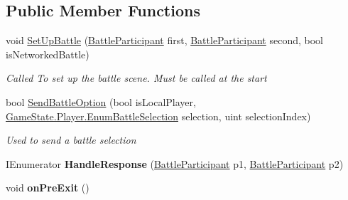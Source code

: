 \subsection*{Public Member Functions}
\begin{DoxyCompactItemize}
\item 
void \hyperlink{class_battle_handler_a380a371e96df1b362027a8f33c8ed7fb}{Set\-Up\-Battle} (\hyperlink{class_battle_participant}{Battle\-Participant} first, \hyperlink{class_battle_participant}{Battle\-Participant} second, bool is\-Networked\-Battle)
\begin{DoxyCompactList}\small\item\em Called To set up the battle scene. Must be called at the start \end{DoxyCompactList}\item 
bool \hyperlink{class_battle_handler_ad207e2adf6f1f3882e98b1c8a5f59f67}{Send\-Battle\-Option} (bool is\-Local\-Player, \hyperlink{class_game_state_1_1_player_a9f54c5eca1e60acbaa2074e981f51615}{Game\-State.\-Player.\-Enum\-Battle\-Selection} selection, uint selection\-Index)
\begin{DoxyCompactList}\small\item\em Used to send a battle selection \end{DoxyCompactList}\item 
\hypertarget{class_battle_handler_ad69bfcfc81caec50b1db97edb95e33b1}{I\-Enumerator {\bfseries Handle\-Response} (\hyperlink{class_battle_participant}{Battle\-Participant} p1, \hyperlink{class_battle_participant}{Battle\-Participant} p2)}\label{class_battle_handler_ad69bfcfc81caec50b1db97edb95e33b1}

\item 
\hypertarget{class_battle_handler_a13610e1414fd1f866292588574c96139}{void {\bfseries on\-Pre\-Exit} ()}\label{class_battle_handler_a13610e1414fd1f866292588574c96139}

\end{DoxyCompactItemize}
